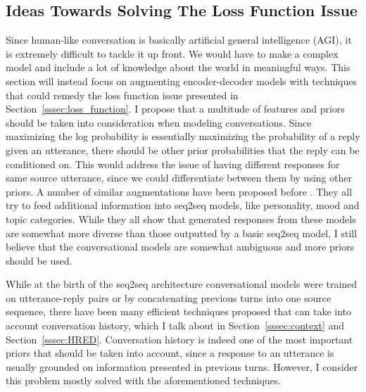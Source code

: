\documentclass[12pt]{article}
\begin{document}
\subsection{Ideas Towards Solving The Loss Function Issue} \label{ssec:61}
Since human-like conversation is basically artificial general intelligence (AGI), it is extremely difficult to tackle it up front. We would have to make a complex model and include a lot of knowledge about the world in meaningful ways. This section will instead focus on augmenting encoder-decoder models with techniques that could remedy the loss function issue presented in Section~\ref{sssec:loss_function}. I propose that a multitude of features and priors should be taken into consideration when modeling conversations. Since maximizing the log probability is essentially maximizing the probability of a reply given an utterance, there should be other prior probabilities that the reply can be conditioned on. This would address the issue of having different responses for same source utterance, since we could differentiate between them by using other priors. A number of similar augmentations have been proposed before \cite{Li:2016,Xing_topic:2017,Zhou:2017,Choudhary:2017}. They all try to feed additional information into seq2seq models, like personality, mood and topic categories. While they all show that generated responses from these models are somewhat more diverse than those outputted by a basic seq2seq model, I still believe that the conversational models are somewhat ambiguous and more priors should be used.

While at the birth of the seq2seq architecture conversational models were trained on utterance-reply pairs or by concatenating previous turns into one source sequence, there have been many efficient techniques proposed that can take into account conversation history, which I talk about in Section~\ref{sssec:context} and Section~\ref{sssec:HRED}. Conversation history is indeed one of the most important priors that should be taken into account, since a response to an utterance is usually grounded on information presented in previous turns. However, I consider this problem mostly solved with the aforementioned techniques.
\end{document}
